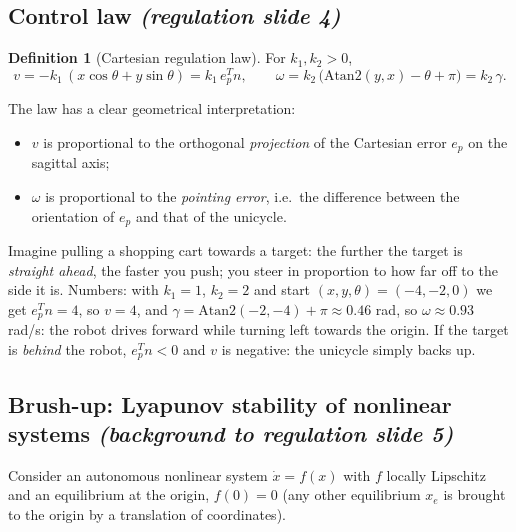 \documentclass[11pt,a4paper]{article}
\def\bm#1{#1}%
\theoremstyle{definition}
\newtheorem{definition}{Definition}[section]
\theoremstyle{plain}
\theoremstyle{remark}
\begin{document}
\subsection{Control law \emph{(regulation slide 4)}}

\begin{definition}[Cartesian regulation law]
For $k_1,k_2>0$,
\[
v=-k_1\,(x\cos\theta+y\sin\theta)=k_1\,\bm e_p^T\bm n,\qquad
\omega=k_2\,\bigl(\mathrm{Atan2}(y,x)-\theta+\pi\bigr)=k_2\,\gamma .
\]
\end{definition}

The law has a clear geometrical interpretation:
\begin{itemize}[leftmargin=*,nosep]
\item $v$ is proportional to the orthogonal \emph{projection} of the Cartesian error $\bm e_p$ on the sagittal axis;
\item $\omega$ is proportional to the \emph{pointing error}, i.e.\ the difference between the orientation of $\bm e_p$ and that of the unicycle.
\end{itemize}

\begin{intuition}
Imagine pulling a shopping cart towards a target: the further the target is \emph{straight ahead}, the faster you push; you steer in proportion to how far off to the side it is. Numbers: with $k_1=1$, $k_2=2$ and start $(x,y,\theta)=(-4,-2,0)$ we get $\bm e_p^T\bm n=4$, so $v=4$, and $\gamma=\mathrm{Atan2}(-2,-4)+\pi\approx0.46$ rad, so $\omega\approx0.93$ rad/s: the robot drives forward while turning left towards the origin. If the target is \emph{behind} the robot, $\bm e_p^T\bm n<0$ and $v$ is negative: the unicycle simply backs up.
\end{intuition}

\subsection{Brush-up: Lyapunov stability of nonlinear systems \emph{(background to regulation slide 5)}}\label{sec:lyap}

Consider an autonomous nonlinear system $\dot{\bm x}=\bm f(\bm x)$ with $\bm f$ locally Lipschitz and an equilibrium at the origin, $\bm f(\bm 0)=\bm 0$ (any other equilibrium $\bm x_e$ is brought to the origin by a translation of coordinates).
\end{document}
